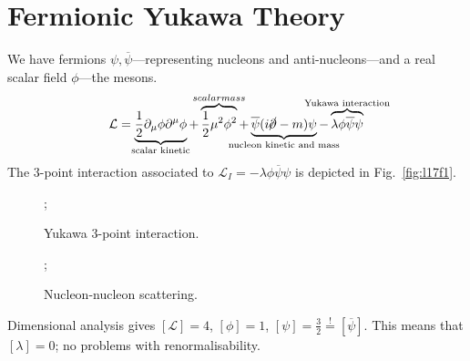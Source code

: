 \section{Fermionic Yukawa Theory}%
\label{sec:fermionic_yukawa_theory}

We have fermions $\psi, \overline{\psi}$---representing nucleons and anti-nucleons---and a real scalar field $\phi$---the mesons.
\begin{equation}
  \mathcal{L} = \underbrace{\frac{1}{2} \partial_{\mu} \phi \partial^{\mu} \phi}_{\mathclap{\text{scalar kinetic}}} + \overbrace{\frac{1}{2} \mu^2 \phi^2}^{\mathclap{scalar mass}} + \underbrace{\overline{\psi}(i \cancel{\partial} - m) \psi}_{\mathclap{\text{nucleon kinetic and mass}}} - \overbrace{\lambda \phi \overline{\psi} \psi}^{\mathclap{\text{Yukawa interaction}}}
\end{equation}
The $3$-point interaction associated to $\mathcal{L}_I = - \lambda \phi \overline{\psi} \psi$ is depicted in Fig.~\ref{fig:l17f1}.
\begin{figure}
  \begin{minipage}[t]{0.5\columnwidth}
    \centering
    ;
    \caption{Yukawa $3$-point interaction.}
    \label{fig:l17f1}
  \end{minipage}%
  \begin{minipage}[t]{0.5\columnwidth}
    \centering
    ;
    \caption{Nucleon-nucleon scattering.}
    \label{fig:l17f2}
  \end{minipage}
\end{figure}

Dimensional analysis gives $[\mathcal{L}] = 4$, $[\phi] = 1$, $[\psi] = \frac{3}{2} \stackrel{!}{=} \left[\overline{\psi}\right]$. This means that $[\lambda] = 0$; no problems with renormalisability.

